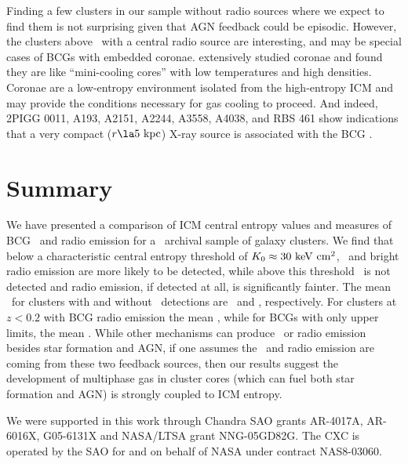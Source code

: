 \documentclass[12pt,preprint]{aastex}
\begin{document}
Finding a few clusters in our sample without radio sources where we
expect to find them is not surprising given that AGN feedback could be
episodic. However, the clusters above \kthr\ with a central radio
source are interesting, and may be special cases of BCGs with embedded
coronae. \cite{coronae} extensively studied coronae and found they are
like ``mini-cooling cores'' with low temperatures and high
densities. Coronae are a low-entropy environment isolated from the
high-entropy ICM and may provide the conditions necessary for gas
cooling to proceed. And indeed, 2PIGG 0011, A193, A2151, A2244, A3558,
A4038, and RBS 461 show indications that a very compact ($r \la
5\kpc$) X-ray source is associated with the BCG \citep{accept}.

\section{Summary}
\label{sec:diss}

We have presented a comparison of ICM central entropy values and
measures of BCG \halpha\ and radio emission for a \Chandra\ archival
sample of galaxy clusters. We find that below a characteristic central
entropy threshold of $K_0 \approx 30 \mathrm{\mbox{\ensuremath{\mathrm{~keV}}} \mathrm{\mbox{\ensuremath{\mathrm{~cm}}}^2}}$, \halpha\ and bright radio
emission are more likely to be detected, while above this threshold
\halpha\ is not detected and radio emission, if detected at all, is
significantly fainter. The mean \kna\ for clusters with and without
\halpha\ detections are \fha\ and \nfha, respectively. For clusters at
$z < 0.2$ with BCG radio emission the mean \frad, while for BCGs with
only upper limits, the mean \nfrad. While other mechanisms can produce
\halpha\ or radio emission besides star formation and AGN, if one
assumes the \halpha\ and radio emission are coming from these two
feedback sources, then our results suggest the development of
multiphase gas in cluster cores (which can fuel both star formation
and AGN) is strongly coupled to ICM entropy.

\acknowledgements
We were supported in this work through Chandra SAO grants AR-4017A,
AR-6016X, G05-6131X and NASA/LTSA grant NNG-05GD82G. The CXC is
operated by the SAO for and on behalf of NASA under contract
NAS8-03060.
\end{document}
